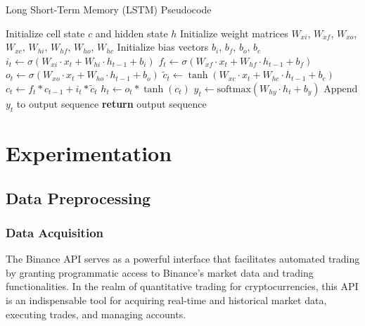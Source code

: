 \documentclass[10pt,twocolumn,letterpaper]{article}
\begin{document}
\begin{algorithm*}
   \caption{Long Short-Term Memory (LSTM) Pseudocode}
   \begin{algorithmic}[1] %
      \State Initialize cell state $c$ and hidden state $h$
      \State Initialize weight matrices $W_{xi}$, $W_{xf}$, $W_{xo}$, $W_{xc}$, $W_{hi}$, $W_{hf}$, $W_{ho}$, $W_{hc}$
      \State Initialize bias vectors $b_{i}$, $b_{f}$, $b_{o}$, $b_{c}$
      \State $i_t \gets \sigma(W_{xi} \cdot x_t + W_{hi} \cdot h_{t-1} + b_{i})$ 
      \State $f_t \gets \sigma(W_{xf} \cdot x_t + W_{hf} \cdot h_{t-1} + b_{f})$ 
      \State $o_t \gets \sigma(W_{xo} \cdot x_t + W_{ho} \cdot h_{t-1} + b_{o})$ 
      \State $\tilde{c}_t \gets \tanh(W_{xc} \cdot x_t + W_{hc} \cdot h_{t-1} + b_{c})$ 
      \State $c_t \gets f_t \ast c_{t-1} + i_t \ast \tilde{c}_t$ 
      \State $h_t \gets o_t \ast \tanh(c_t)$ 
      \State $y_t \gets \text{softmax}(W_{hy} \cdot h_t + b_{y})$ 
      \State Append $y_t$ to output sequence
      \EndFor
      \State \textbf{return} output sequence
      \EndProcedure
   \end{algorithmic}
\end{algorithm*}

\section{Experimentation} \label{sec:experimentation}

\subsection{Data Preprocessing}


\subsubsection{Data Acquisition}

The Binance API serves as a powerful interface that facilitates automated trading by granting programmatic access to Binance's market data and trading functionalities. In the realm of quantitative trading for cryptocurrencies, this API is an indispensable tool for acquiring real-time and historical market data, executing trades, and managing accounts.
\end{document}
